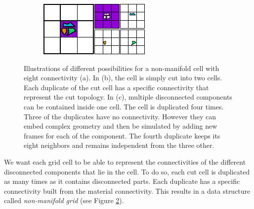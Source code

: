\begin{figure}[t]
\hfill
\begin{subfigure}[b]{0.40\linewidth}
\centering
\includegraphics[width=\linewidth]{images/cutting-mig2015/little_pieces.pdf}
\caption{\label{fig:littlePieces}}
\end{subfigure}
\caption[Frame-based cutting: Non-manifold grid illustration]{\label{fig:nonmanifoldgridillustration}
Illustrations of different possibilities for a non-manifold cell with eight connectivity (a). In (b), the cell is simply cut into two cells. Each duplicate of the cut cell has a specific connectivity that represent the cut topology. In (c), multiple disconnected components can be contained inside one cell. The cell is duplicated four times. Three of the duplicates have no connectivity. However they can embed complex geometry and then be simulated by adding new frames for each of the component. The fourth duplicate keeps its eight neighbors and remains independent from the three other.}
\end{figure}

We want each grid cell to be able to represent  the connectivities of the different disconnected components that lie in the cell. To do so, each cut cell is duplicated as many times as it contains disconnected parts. Each duplicate has a specific connectivity built from the material connectivity. This results in a data structure called \emph{non-manifold grid} (see Figure \ref{fig:nonmanifoldgridillustration}).


